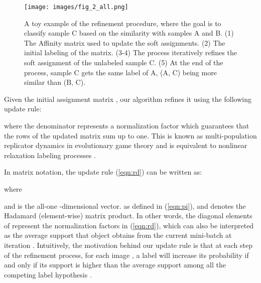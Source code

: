 \documentclass[runningheads]{llncs}
\begin{document}
\iffalse
\begin{figure}[t]
  \centering
  \texttt{[image: images/0\_aff\_new.png]}
  \texttt{[image: images/1\_start\_new.png]}
  \texttt{[image: images/2\_1st\_new.png]}
  \texttt{[image: images/3\_2nd\_new.png]}
  \texttt{[image: images/4\_end\_new.png]}
  \caption{A  toy example of  the  refinement  procedure, where the goal is to classify sample C based on the similarity with samples A and B. From left to right: (1) The Affinity matrix used to update the soft assignments. (2) The initial labeling of the matrix. (3-4) The process iteratively refines the soft assignment of the unlabeled sample C. (5) At the end of the process, sample C gets the same label of A, (A, C) being more similar than (B, C).}
  \label{fig:gtg_prior}
\end{figure}
\fi

\begin{figure}[t]
    \centering
    \texttt{[image: images/fig\_2\_all.png]}
    \caption{A  toy example of  the  refinement  procedure, where the goal is to classify sample C based on the similarity with samples A and B. (1) The Affinity matrix used to update the soft assignments. (2) The initial labeling of the matrix. (3-4) The process iteratively refines the soft assignment of the unlabeled sample C. (5) At the end of the process, sample C gets the same label of A, (A, C) being more similar than (B, C).}
  \label{fig:gtg_prior}
\end{figure}


Given the initial assignment matrix , our algorithm refines it using the following update rule:

where the denominator represents a normalization factor which guarantees that the rows of the updated matrix sum up to one. 
This is known as multi-population replicator dynamics in evolutionary game theory \cite{weibull1997evolutionary} and is equivalent to nonlinear relaxation labeling processes \cite{RosHumZuc76,DBLP:journals/jmiv/Pelillo97}.

In matrix notation, the update rule (\ref{eqn:rd}) can be written as:

where 

and  is the all-one -dimensional vector.
 as defined in (\ref{eqn:pi}), and  denotes the Hadamard (element-wise) matrix product.
In other words, the diagonal elements of  represent the normalization factors in (\ref{eqn:rd}), which can also be interpreted as the average support that object  obtains from the current mini-batch at iteration .
Intuitively, the motivation behind our update rule is that at each step of the refinement process, for each image , a label  will increase its probability  if and only if its support  is higher than the average support among all the competing label hypothesis .
\end{document}

